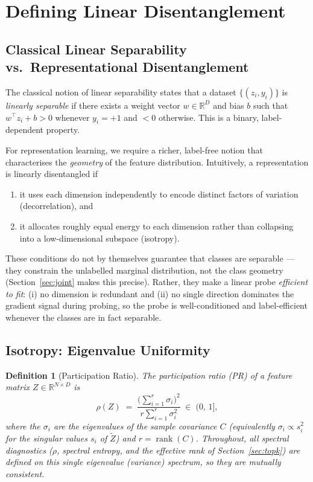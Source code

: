 \documentclass[11pt,a4paper]{article}
\newtheorem{definition}[theorem]{Definition}
\newcommand{\R}{\mathbb{R}}
\newcommand{\rank}{\operatorname{rank}}
\begin{document}
\section{Defining Linear Disentanglement}
\label{sec:definition}

\subsection{Classical Linear Separability vs.\ Representational Disentanglement}
\label{sec:classical}

The classical notion of linear separability states that a dataset
$\{(z_i, y_i)\}$ is \emph{linearly separable} if there exists a weight vector
$w \in \R^D$ and bias $b$ such that $w^\top z_i + b > 0$ whenever $y_i = +1$ and
$< 0$ otherwise.
This is a binary, label-dependent property.

For representation learning, we require a richer, label-free notion that
characterises the \emph{geometry} of the feature distribution.
Intuitively, a representation is linearly disentangled if

\begin{enumerate}
    \item it uses each dimension independently to encode distinct factors of
          variation (decorrelation), and
    \item it allocates roughly equal energy to each dimension rather than
          collapsing into a low-dimensional subspace (isotropy).
\end{enumerate}

\noindent These conditions do not by themselves guarantee that classes are
separable — they constrain the unlabelled marginal distribution, not the class
geometry (Section~\ref{sec:joint} makes this precise).  Rather, they make a
linear probe \emph{efficient to fit}: (i) no dimension is redundant and (ii) no
single direction dominates the gradient signal during probing, so the probe is
well-conditioned and label-efficient whenever the classes are in fact separable.

\subsection{Isotropy: Eigenvalue Uniformity}
\label{sec:isotropy}

\begin{definition}[Participation Ratio]
\label{def:pr}
The \emph{participation ratio} (PR) of a feature matrix $Z \in \R^{N \times D}$
is
\[
    \rho(Z) \;=\; \frac{\bigl(\sum_{i=1}^r \sigma_i\bigr)^2}{\,r \sum_{i=1}^r \sigma_i^2\,}
    \;\in\; \bigl(0,\, 1\bigr],
\]
where the $\sigma_i$ are the eigenvalues of the sample covariance $C$
(equivalently $\sigma_i \propto s_i^2$ for the singular values $s_i$ of
$\tilde{Z}$) and $r = \rank(C)$.  Throughout, all spectral diagnostics
($\rho$, spectral entropy, and the effective rank of
Section~\ref{sec:topk}) are defined on this single eigenvalue (variance)
spectrum, so they are mutually consistent.
\end{definition}
\end{document}

